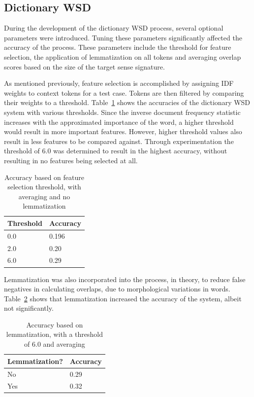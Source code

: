 \documentclass[11pt]{article}
\begin{document}
\subsection{Dictionary WSD}
During the development of the dictionary WSD process, several optional parameters were introduced. Tuning these parameters significantly affected the accuracy of the process. These parameters include the threshold for feature selection, the application of lemmatization on all tokens and averaging overlap scores based on the size of the target sense signature.

As mentioned previously, feature selection is accomplished by assigning IDF weights to context tokens for a test case. Tokens are then filtered by comparing their weights to a threshold. Table~\ref{threshold} shows the accuracies of the dictionary WSD system with various thresholds. Since the inverse document frequency statistic increases with the approximated importance of the word, a higher threshold would result in more important features. However, higher threshold values also result in less features to be compared against. Through experimentation the threshold of $6.0$ was determined to result in the highest accuracy, without resulting in no features being selected at all.

\begin{table}[ht]
    \centering
    \begin{tabular}{|l|l|}
    \hline
    Threshold                          & Accuracy   \\ \hline
    0.0 & 0.196 \\
    2.0        & 0.20 \\
    6.0                   & 0.29 \\ \hline
    \end{tabular}
\caption{Accuracy based on feature selection threshold, with averaging and no lemmatization}
\label{threshold}
\end{table}

Lemmatization was also incorporated into the process, in theory, to reduce false negatives in calculating overlaps, due to morphological variations in words. Table~\ref{lemmatization} shows that lemmatization increased the accuracy of the system, albeit not significantly. 

\begin{table}[ht]
    \centering
    \begin{tabular}{|l|l|}
    \hline
    Lemmatization?                          & Accuracy   \\ \hline
    No & 0.29 \\
    Yes        & 0.32 \\ \hline
    \end{tabular}
\caption{Accuracy based on lemmatization, with a threshold of 6.0 and averaging}
\label{lemmatization}
\end{table}
\end{document}

